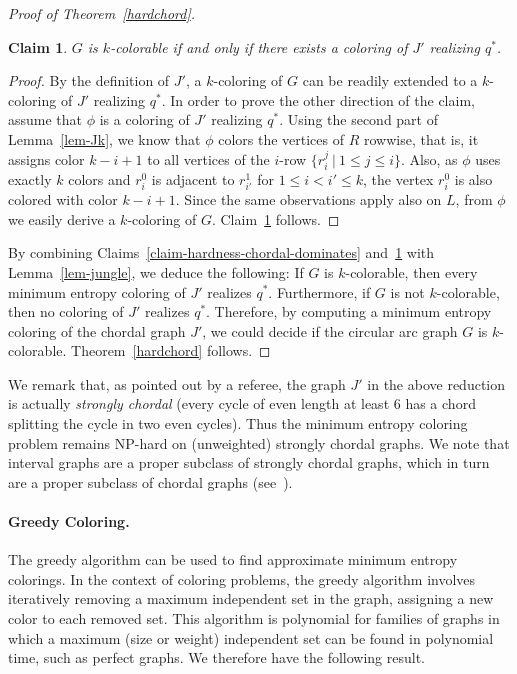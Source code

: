 \documentclass[10pt,a4paper]{article}
\newtheorem{claim}{Claim}
\begin{document}
\begin{proof}[Proof of Theorem~\ref{hardchord}]
\begin{claim}
\label{claim-hardness-chordal-iff}
$G$ is $k$-colorable if and only if there exists a coloring of $J'$ realizing $q^*$.
\end{claim}
\begin{proof}
By the definition of $J'$, a $k$-coloring of $G$ can be readily extended
to a $k$-coloring of $J'$ realizing $q^*$. In order to prove the other
direction of the claim, assume that $\phi$ is a coloring of $J'$ realizing $q^{*}$.
Using the second part of Lemma~\ref{lem-Jk}, we know that $\phi$
colors the vertices of $R$ rowwise, that is, it assigns color $k-i+1$
to all vertices of the $i$-row $\{r_i^j\ |\ 1 \le j \le i\}$.  Also, as $\phi$ uses exactly
$k$ colors and $r_i^0$ is adjacent to  $r_{i'}^1$ for $1\leq i < i' \leq k$,
the vertex $r_i^0$ is also colored with color $k-i+1$. Since the same observations
apply also on $L$, from $\phi$ we easily derive a $k$-coloring of $G$.
Claim~\ref{claim-hardness-chordal-iff} follows.
\end{proof}

By combining Claims~\ref{claim-hardness-chordal-dominates} and~\ref{claim-hardness-chordal-iff}
with Lemma~\ref{lem-jungle}, we deduce the following: If
$G$ is $k$-colorable, then every minimum entropy coloring of $J'$ realizes $q^{*}$.
Furthermore, if $G$ is not $k$-colorable, then
no coloring of $J'$ realizes $q^{*}$. Therefore, by computing a minimum entropy coloring 
of the chordal graph $J'$, we could decide if the circular arc graph $G$ is $k$-colorable.
Theorem~\ref{hardchord} follows.
\end{proof}

We remark that, as pointed out by a referee,
the graph $J'$ in the above reduction is actually {\em strongly chordal}
(every cycle of even length at least $6$ has a chord splitting the cycle in two even cycles).
Thus the minimum entropy coloring problem remains NP-hard on (unweighted) strongly chordal graphs.
We note that interval graphs are a proper subclass of strongly chordal graphs, which in turn are a proper subclass of chordal graphs (see~\cite{BVS99}).

\paragraph{Greedy Coloring.}

The greedy algorithm can be used to find approximate minimum entropy colorings. In the context of coloring problems, the greedy algorithm involves iteratively removing a maximum independent set in the graph, assigning a new color to each removed set. This algorithm is polynomial for families of graphs in which a maximum (size or weight) independent set can be found in polynomial time, such as perfect graphs. 
We therefore have the following result.
\end{document}
